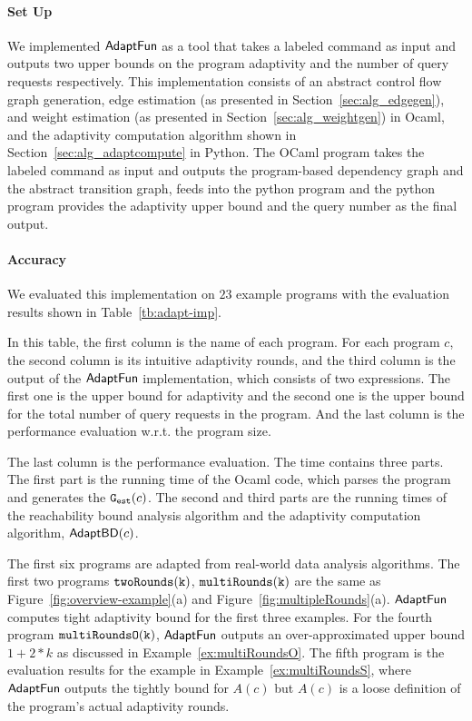 
\paragraph{Set Up}
We implemented $\textsf{AdaptFun}$ as a tool that takes a labeled command as input 
and outputs two upper bounds on the program adaptivity and the number of query requests respectively.
This implementation consists of an 
abstract control flow graph generation,
edge estimation (as presented in Section~\ref{sec:alg_edgegen}), and weight estimation (as presented in Section~\ref{sec:alg_weightgen}) in Ocaml, 
and the adaptivity computation algorithm shown in Section~\ref{sec:alg_adaptcompute} in Python.
The OCaml program takes the labeled command as input and outputs the program-based dependency graph and
the abstract transition graph,
feeds into the python program and the python program provides the adaptivity upper bound and the query number as the final output.


\paragraph{Accuracy}
We evaluated this implementation on $23$ example programs with the evaluation results shown in Table~\ref{tb:adapt-imp}.


In this table,
the first column is the name of each program.
For each program $c$, the second column is its intuitive adaptivity rounds,
and the third column is the output of the $\textsf{AdaptFun}$ implementation, which consists of two expressions.
The first one is the upper bound for adaptivity and the second one is the 
upper bound for the total number of query requests in the program. And the last column is the performance evaluation w.r.t. the program size.

The last column is the performance evaluation.
The time contains three parts. The first part is the running time of the Ocaml code, which parses the program and generates the $\mathtt{{G_{est}}}(c)$.
The second and third parts are the running times of the reachability bound analysis algorithm
and the adaptivity computation algorithm, $\mathsf{AdaptBD}(c)$.

The first six programs are adapted from real-world data analysis algorithms.
The first two programs $\mathtt{twoRounds(k)}$, $ \mathtt{multiRounds(k)}$ are the same as Figure~\ref{fig:overview-example}(a) and Figure~\ref{fig:multipleRounds}(a).
$\textsf{AdaptFun}$ computes tight adaptivity bound for the first three examples.
For the fourth program $\mathtt{multiRoundsO(k)}$, $\textsf{AdaptFun}$ outputs an over-approximated upper bound $1 + 2*k$ 
as discussed in Example~\ref{ex:multiRoundsO}. 
The fifth program is the evaluation results for the example in Example~\ref{ex:multiRoundsS}, where $\textsf{AdaptFun}$ outputs the tightly bound for $A(c)$ but $A(c)$ is a loose definition of the program's actual adaptivity rounds.
%

